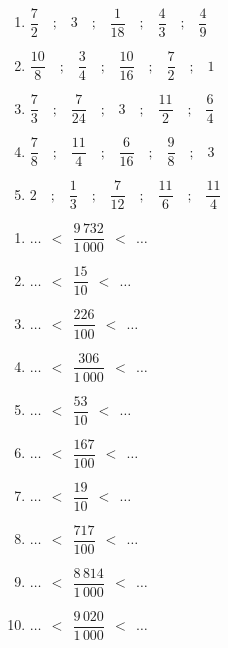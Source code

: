 \documentclass[9pt]{article}
\begin{document}
\begin{multicols}{2}
\begin{exercice}
\begin{enumerate}
	\item $\dfrac{7}{2}\quad\text{;}\quad$$3\quad\text{;}\quad$$\dfrac{1}{18}\quad\text{;}\quad$$\dfrac{4}{3}\quad\text{;}\quad$$\dfrac{4}{9}$
	\item $\dfrac{10}{8}\quad\text{;}\quad$$\dfrac{3}{4}\quad\text{;}\quad$$\dfrac{10}{16}\quad\text{;}\quad$$\dfrac{7}{2}\quad\text{;}\quad$$1$
	\item $\dfrac{7}{3}\quad\text{;}\quad$$\dfrac{7}{24}\quad\text{;}\quad$$3\quad\text{;}\quad$$\dfrac{11}{2}\quad\text{;}\quad$$\dfrac{6}{4}$
	\item $\dfrac{7}{8}\quad\text{;}\quad$$\dfrac{11}{4}\quad\text{;}\quad$$\dfrac{6}{16}\quad\text{;}\quad$$\dfrac{9}{8}\quad\text{;}\quad$$3$
	\item $2\quad\text{;}\quad$$\dfrac{1}{3}\quad\text{;}\quad$$\dfrac{7}{12}\quad\text{;}\quad$$\dfrac{11}{6}\quad\text{;}\quad$$\dfrac{11}{4}$
\end{enumerate}
\end{exercice}

\begin{exercice}
\begin{enumerate}
	\item $\ldots~~ < ~~\dfrac{9\,732}{1\,000}~~ < ~~\ldots$
	\item $\ldots~~ < ~~\dfrac{15}{10}~~ < ~~\ldots$
	\item $\ldots~~ < ~~\dfrac{226}{100}~~ < ~~\ldots$
	\item $\ldots~~ < ~~\dfrac{306}{1\,000}~~ < ~~\ldots$
	\item $\ldots~~ < ~~\dfrac{53}{10}~~ < ~~\ldots$
	\item $\ldots~~ < ~~\dfrac{167}{100}~~ < ~~\ldots$
	\item $\ldots~~ < ~~\dfrac{19}{10}~~ < ~~\ldots$
	\item $\ldots~~ < ~~\dfrac{717}{100}~~ < ~~\ldots$
	\item $\ldots~~ < ~~\dfrac{8\,814}{1\,000}~~ < ~~\ldots$
	\item $\ldots~~ < ~~\dfrac{9\,020}{1\,000}~~ < ~~\ldots$
\end{enumerate}
\end{exercice}


\end{multicols}
\end{document}
